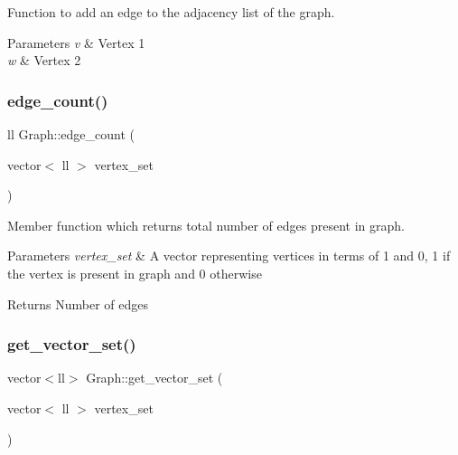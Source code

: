 Function to add an edge to the adjacency list of the graph. 


\begin{DoxyParams}{Parameters}
{\em v} & Vertex 1 \\
\hline
{\em w} & Vertex 2 \\
\hline
\end{DoxyParams}
\mbox{\label{classGraph_ac63411364245eb9ae4009429a38621f7}} 
\subsubsection{\texorpdfstring{edge\+\_\+count()}{edge\_count()}}
{\footnotesize\ttfamily ll Graph\+::edge\+\_\+count (\begin{DoxyParamCaption}\item[{vector$<$ ll $>$}]{vertex\+\_\+set }\end{DoxyParamCaption})\hspace{0.3cm}{\ttfamily [inline]}}



Member function which returns total number of edges present in graph. 


\begin{DoxyParams}{Parameters}
{\em vertex\+\_\+set} & A vector representing vertices in terms of 1 and 0, 1 if the vertex is present in graph and 0 otherwise \\
\hline
\end{DoxyParams}
\begin{DoxyReturn}{Returns}
Number of edges 
\end{DoxyReturn}
\mbox{\label{classGraph_ab374b601113c5afe1d6d81c72ccb1fa4}} 
\subsubsection{\texorpdfstring{get\+\_\+vector\+\_\+set()}{get\_vector\_set()}}
{\footnotesize\ttfamily vector$<$ll$>$ Graph\+::get\+\_\+vector\+\_\+set (\begin{DoxyParamCaption}\item[{vector$<$ ll $>$}]{vertex\+\_\+set }\end{DoxyParamCaption})\hspace{0.3cm}{\ttfamily [inline]}}



